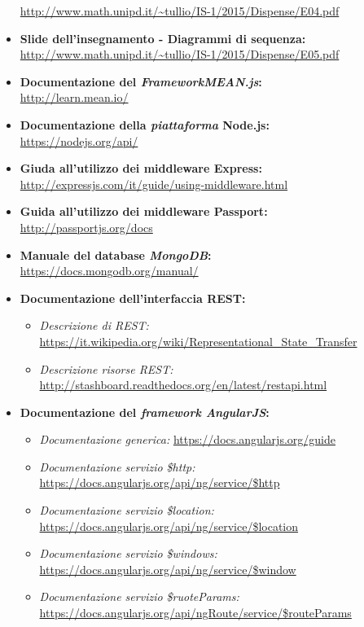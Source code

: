 \begin{itemize}
		\url{http://www.math.unipd.it/~tullio/IS-1/2015/Dispense/E04.pdf}
	\item \textbf{Slide dell'insegnamento - Diagrammi di sequenza:} \\
		\url{http://www.math.unipd.it/~tullio/IS-1/2015/Dispense/E05.pdf}
	\item \textbf{Documentazione del \textit{FrameworkMEAN.js}:} \\
		\url{http://learn.mean.io/}
	\item \textbf{Documentazione della \textit{piattaforma} Node.js:} \\
		\url{https://nodejs.org/api/}
	\item \textbf{Giuda all'utilizzo dei middleware Express:} \\
		\url{http://expressjs.com/it/guide/using-middleware.html}
	\item \textbf{Guida all'utilizzo dei middleware Passport:} \\
		\url{http://passportjs.org/docs}
	\item \textbf{Manuale del database \textit{MongoDB}:} \\
		\url{https://docs.mongodb.org/manual/}
	\item \textbf{Documentazione dell'interfaccia REST:}
		\begin{itemize}
			\item \textit{Descrizione di REST:} \url{https://it.wikipedia.org/wiki/Representational_State_Transfer}
			\item \textit{Descrizione risorse REST:} \url{http://stashboard.readthedocs.org/en/latest/restapi.html}
		\end{itemize}
	\item \textbf{Documentazione del \textit{framework AngularJS}:} \\
		\begin{itemize}
			\item \textit{Documentazione generica:} \url{https://docs.angularjs.org/guide}
			\item \textit{Documentazione servizio \$http:} \url{https://docs.angularjs.org/api/ng/service/$http}
			\item \textit{Documentazione servizio \$location:} \url{https://docs.angularjs.org/api/ng/service/$location}
			\item \textit{Documentazione servizio \$windows:} \url{https://docs.angularjs.org/api/ng/service/$window}
			\item \textit{Documentazione servizio \$ruoteParams:} \url{https://docs.angularjs.org/api/ngRoute/service/$routeParams}

\end{itemize}
\end{itemize}
